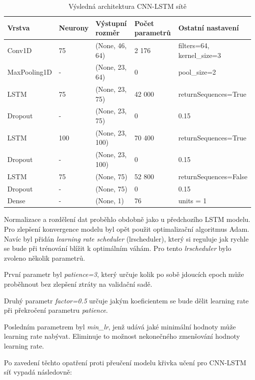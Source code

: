 \documentclass[FM,BP,fonts]{tulthesis}
\begin{document}
\begin{table}[!ht]
	\centering
	\caption{Výsledná architektura CNN-LSTM sítě}
	
	\begin{tabularx}{\linewidth}{llXXX}
		\hline
		\textbf{Vrstva} & \textbf{Neurony} & \textbf{Výstupní rozměr} & \textbf{Počet parametrů} & \textbf{Ostatní nastavení} \\ \hline
			Conv1D & 75 &  (None, 46, 64)   & 2 176 & filters=64, kernel\_size=3 \\
			MaxPooling1D & - &  (None, 23, 64)   & 0 & pool\_size=2 \\
			LSTM & 75 & (None, 23, 75) &  42 000 & returnSequences=True \\
			Dropout & - & (None, 23, 75) & 0 & 0.15 \\
			LSTM  & 100 & (None, 23, 100) & 70 400 & returnSequences=True \\
			Dropout & - & (None, 23, 100) & 0 & 0.15 \\
			LSTM   & 75 & (None, 75) & 52 800 & returnSequences=False \\
			Dropout & - & (None, 75) & 0 & 0.15 \\
			Dense & - & (None, 1) & 76 & units = 1 \\
	\end{tabularx}
\end{table}

Normalizace a rozdělení dat proběhlo obdobně jako u předchozího LSTM modelu. Pro zlepšení konvergence modelu byl opět použit optimalizační algoritmus Adam. Navíc byl přidán \textit{learning rate scheduler} (lrscheduler), který si reguluje jak rychle se bude při trénování blížit k optimálním váhám. Pro tento \textit{lrscheduler} bylo zvoleno několik parametrů. 

První parametr byl \textit{patience=3}, který určuje kolik po sobě jdoucích epoch může proběhnout bez zlepšení ztráty na validační sadě. 

Druhý parametr \textit{factor=0.5} určuje jakým koeficientem se bude dělit learning rate při překročení parametru \textit{patience}. 

Posledním parametrem byl \textit{min\_lr}, jenž udává jaké minimální hodnoty může learning rate nabývat. Eliminuje to možnost nekonečného zmenšování hodnoty learning rate.

Po zavedení těchto opatření proti přeučení modelu křivka učení pro CNN-LSTM síť vypadá následovně:
\end{document}
